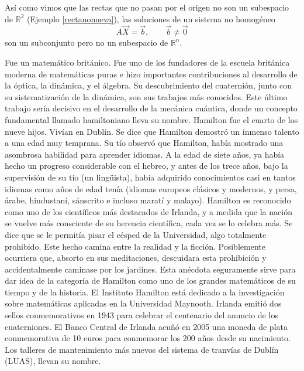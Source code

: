 \begin{remark}
\label{SHSNH}
Así como vimos que las rectas que no pasan por el origen no son un subespacio de $\mathbb{R}^2$ (Ejemplo  \ref{rectanonueva}), las soluciones de un sistema no homogéneo 
$$A\vec{X}=\vec{b}, \qquad  \vec{b} \neq \vec{0}$$  son un subconjunto pero no un subespacio de    $\mathbb{R}^n$.
\end{remark}

\bigskip

\begin{parchment}{ Fue un matemático británico. Fue uno de los fundadores de la escuela británica moderna de matemáticas puras e hizo importantes contribuciones al desarrollo de la óptica, la dinámica, y el álgebra. Su descubrimiento del cuaternión, junto con su sistematización de la dinámica, son sus trabajos más conocidos. Este último trabajo sería decisivo en el desarrollo de la mecánica cuántica, donde un concepto fundamental llamado hamiltoniano lleva su nombre.
Hamilton fue el cuarto de los nueve hijos. Vivían en Dublín. Se dice que Hamilton demostró un inmenso talento a una edad muy temprana. 
Su tío observó que Hamilton, había mostrado una asombrosa habilidad para aprender idiomas. A la edad de siete años, ya había hecho un progreso considerable con el hebreo, y antes de los trece años, bajo la supervisión de su tío (un lingüista), había adquirido conocimientos casi en tantos idiomas como años de edad tenía (idiomas europeos clásicos y modernos, y persa, árabe, hindustaní, sánscrito e incluso maratí y malayo).
Hamilton es reconocido como uno de los científicos más destacados de Irlanda, y a medida que la nación se vuelve más consciente de su herencia científica, cada vez se lo celebra más. Se dice que se le permitía pisar el césped de la Universidad, algo totalmente prohibido. Este hecho camina entre la realidad y la ficción. Posiblemente ocurriera que, absorto en sus meditaciones, descuidara esta prohibición y accidentalmente caminase por los jardines. Esta anécdota seguramente sirve para dar idea de la categoría de Hamilton como uno de los grandes matemáticos de su tiempo y de la historia.
El Instituto Hamilton está dedicado a la investigación sobre matemáticas aplicadas en la Universidad Maynooth. 
Irlanda emitió dos sellos conmemorativos en 1943 para celebrar el centenario del anuncio de los cuaterniones. El Banco Central de Irlanda acuñó en 2005 una moneda de plata conmemorativa de 10 euros para conmemorar los 200 años desde su nacimiento.
Los talleres de mantenimiento más nuevos del sistema de tranvías de Dublín (LUAS), llevan su nombre.

}
\end{parchment}
